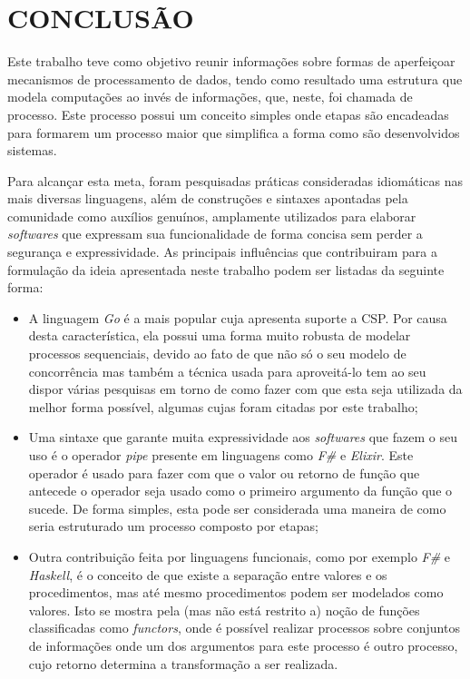 
\chapter{CONCLUSÃO}
\label{chap:conclusao}

Este trabalho teve como objetivo reunir informações sobre formas de aperfeiçoar mecanismos de processamento de dados, tendo como resultado uma estrutura que modela computações ao invés de informações, que, neste, foi chamada de processo. Este processo possui um conceito simples onde etapas são encadeadas para formarem um processo maior que simplifica a forma como são desenvolvidos sistemas.
  
  Para alcançar esta meta, foram pesquisadas práticas consideradas idiomáticas nas mais diversas linguagens, além de construções e sintaxes apontadas pela comunidade como auxílios genuínos, amplamente utilizados para elaborar \textit{softwares} que expressam sua funcionalidade de forma concisa sem perder a segurança e expressividade. As principais influências que contribuiram para a formulação da ideia apresentada neste trabalho podem ser listadas da seguinte forma:
  
  \begin{itemize}
    \item A linguagem \textit{Go} é a mais popular cuja apresenta suporte a CSP. Por causa desta característica, ela possui uma forma muito robusta de modelar processos sequenciais, devido ao fato de que não só o seu modelo de concorrência mas também a técnica usada para aproveitá-lo tem ao seu dispor várias pesquisas em torno de como fazer com que esta seja utilizada da melhor forma possível, algumas cujas foram citadas por este trabalho;
    \item Uma sintaxe que garante muita expressividade aos \textit{softwares} que fazem o seu uso é o operador \textit{pipe} presente em linguagens como \textit{F\#} e \textit{Elixir}. Este operador é usado para fazer com que o valor ou retorno de função que antecede o operador seja usado como o primeiro argumento da função que o sucede. De forma simples, esta pode ser considerada uma maneira de como seria estruturado um processo composto por etapas;
    \item Outra contribuição feita por linguagens funcionais, como por exemplo \textit{F\#} e \textit{Haskell}, é o conceito de que existe a separação entre valores e os procedimentos, mas até mesmo procedimentos podem ser modelados como valores. Isto se mostra pela (mas não está restrito a) noção de funções classificadas como \textit{functors}, onde é possível realizar processos sobre conjuntos de informações onde um dos argumentos para este processo é outro processo, cujo retorno determina a transformação a ser realizada.
  \end{itemize}
  
